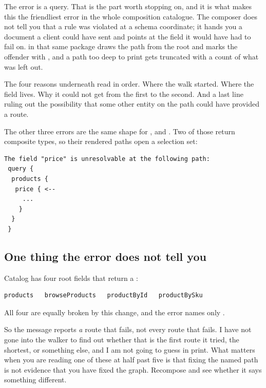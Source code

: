 %
The error is a query. That is the part worth stopping on, and it is what makes
this the friendliest error in the whole composition catalogue. The composer does
not tell you that a rule was violated at a schema coordinate; it hands you a
document a client could have sent and points at the field it would have had to
fail on.  in that same package draws the path from the
root and marks the offender with \code{<--}, and a path too deep to print gets
truncated with a count of what was left out.

The four reasons underneath read in order. Where the walk started. Where the
field lives. Why it could not get from the first to the second. And a last line
ruling out the possibility that some other entity on the path could have
provided a route.

The other three errors are the same shape for ,  and
. Two of those return composite types, so their rendered
paths open a selection set:

\begin{verbatim}
The field "price" is unresolvable at the following path:
 query {
  products {
   price { <--
     ...
    }
  }
 }
\end{verbatim}

\subsection*{One thing the error does not tell you}

%
Catalog has four root fields that return a :

\begin{verbatim}
products   browseProducts   productById   productBySku
\end{verbatim}

All four are equally broken by this change, and the error names only
.

So the message reports \emph{a} route that fails, not every route that fails. I
have not gone into the walker to find out whether that is the first route it
tried, the shortest, or something else, and I am not going to guess in print.
What matters when you are reading one of these at half past five is that fixing
the named path is not evidence that you have fixed the graph. Recompose and see
whether it says something different.

